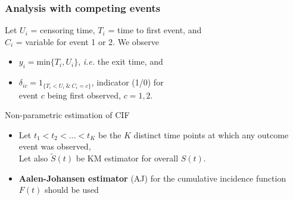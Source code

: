 \documentclass[handout,12pt,dvipsnames,t]{beamer}
\begin{document}



% 
% 


\begin{frame}[fragile]
\frametitle{Analysis with competing events}

Let $U_i$ = censoring time, 
$T_i$ = time to first event, and \\
$C_i$ = variable for event 1 or 2. %
We observe 
\begin{itemize}
\item $y_i = \text{min}\{ T_i, U_i \}$, \textit{i.e.}
the exit time, and
\item
 $ \delta_{ic} = 1_{ \{ T_i < U_i \ \& \ C_i = c\} }$, 
  indicator (1/0) for \\ 
  event $c$ being first observed, $c=1,2$. 
\end{itemize}


Non-parametric estimation %
of CIF

\begin{itemize}
\item
Let $t_1 < t_2 < \dots < t_K$ be the $K$ distinct 
time points at which any outcome event was observed, \\ Let also
 $\widetilde{S}(t)$ be KM estimator for overall $S(t)$. 
\medskip
\item
\textbf{Aalen-Johansen estimator} (AJ) for the cumulative incidence function $F(t)$
should be used 
\end{itemize}

\end{frame}
\end{document}
